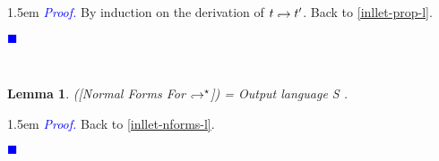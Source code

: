 \documentclass[a4paper,11pt,oneside]{article}
\theoremstyle{plain}
\newtheorem{lemma}[definition]{Lemma}
\renewenvironment{proof}{\noindent \begin{adjustwidth}{1.5em}{} \textcolor{blue}{\textit{Proof.}}}
{{\begin{tiny}\textcolor{blue}{$\blacksquare$}\end{tiny}}
\end{adjustwidth}~\\\noindent}
\newcommand{\tmlet}[3]{let~#1=#2~in~#3}
\newcommand{\tmsbst}[3]{#1 [#2 \mapsfrom #3] }
\newcommand{\bth}{\bot_\theta}
\newcommand{\brh}{\bot_\rho}
\newcommand{\inlsrc}{\textit{ML}^{^2}}
\newcommand{\inlT}{\inlsrc}
\newcommand{\hookdownarrow}{\mathrel{\rotatebox[origin=c]{180}{$\hookleftarrow$}}}
\newcommand{\inlletarr}{\hookdownarrow}
\newcommand{\inllet}[2]{#1 \hookdownarrow #2}
\begin{document}
\begin{proof}
 By induction on the derivation of $\inllet{t}{t'}$.
 \label{TODO-inllet-prop-p}
 Back to \ref{inllet-prop-l}.
 \end{proof}	
	
%
%	
%
%	
%
	
	
\begin{lemma}([Normal Forms For $\inlletarr^\star$]) = Output language S
 \label{inllet-nforms-p}.
\end{lemma}
\begin{proof}
Back to \ref{inllet-nforms-l}.
\end{proof}
\end{document}
